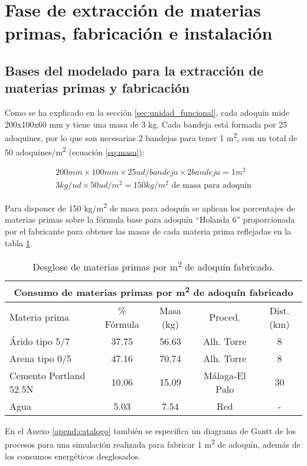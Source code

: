 \section{Fase de extracción de materias primas, fabricación e instalación}

\subsection{Bases del modelado para la extracción de materias primas y fabricación}\label{sec:basesfabricacion}
Como se ha explicado en la sección \ref{sec:unidad_funcional}, cada adoquín mide 200x100x60 \si{mm} y tiene una masa de 3 \si{kg}. Cada bandeja está formada por 25 adoquines, por lo que son necesarias 2 bandejas para tener 1 \si{m^2}, con un total de 50 adoquines/\si{m^2} (ecuación \ref{eq:masa}):

\begin{gather}
200 mm \times 100 mm \times 25 ud/bandeja \times 2 bandeja = 1 m^2\\
3 kg/ud \times 50 ud/m^2 = 150 kg/m^2 \text{ de masa para adoquín}\label{eq:masa}
\end{gather}

Para disponer de 150 \si{kg/m^2} de masa para adoquín se aplican los porcentajes de materias primas sobre la fórmula base para adoquín ``Holanda 6'' proporcionada por el fabricante para obtener las masas de cada materia prima reflejadas en la tabla \ref{desglosemateriasprimas}.

\begin{table}[!htb]
\centering
\begin{tabular}{lcccc}
\toprule
\multicolumn{5}{c}{Consumo de materias primas por \si{m^2} de adoquín fabricado}\\
\midrule
Materia prima & \% Fórmula & Masa (\si{kg}) & Proced. & Dist. (\si{km})\\
\midrule
Árido tipo 5/7 & 37.75 & 56.63 & Alh. Torre & 8\\
Arena tipo 0/5 & 47.16 & 70.74 & Alh. Torre & 8\\
Cemento Portland 52.5N & 10.06 & 15.09 & Málaga-El Palo & 30\\
Agua & 5.03 & 7.54 & Red & -\\
\bottomrule
\end{tabular}
\caption{Desglose de materias primas por \si{m^2} de adoquín fabricado.}
\label{desglosemateriasprimas}
\end{table}

En el Anexo \ref{apend:catalogo} también se especifica un diagrama de Gantt de los procesos para una simulación realizada para fabricar 1 \si{m^2} de adoquín, además de los consumos energéticos desglosados.

